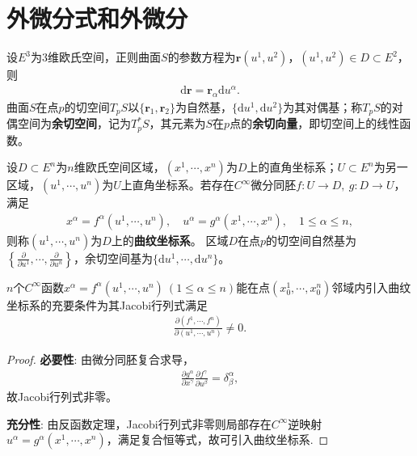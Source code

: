 \documentclass[../../main.tex]{subfiles}%
\begin{document}
\section{外微分式和外微分}

\begin{definition}
设$E^3$为3维欧氏空间，正则曲面$S$的参数方程为$\boldsymbol{r}(u^1,u^2)$，$(u^1,u^2)\in D\subset E^2$，则
\begin{align}
\mathrm{d}\boldsymbol{r}=\boldsymbol{r}_\alpha\mathrm{d}u^\alpha.
\label{eq:dr_surface}
\end{align}
曲面$S$在点$p$的切空间$T_pS$以$\{\boldsymbol{r}_1,\boldsymbol{r}_2\}$为自然基，$\{\mathrm{d}u^1,\mathrm{d}u^2\}$为其对偶基；称$T_pS$的对偶空间为\textbf{余切空间}，记为$T_p^*S$，其元素为$S$在$p$点的\textbf{余切向量}，即切空间上的线性函数。
\end{definition}

\begin{definition}
设$D\subset E^n$为$n$维欧氏空间区域，$(x^1,\cdots,x^n)$为$D$上的直角坐标系；$U\subset E^n$为另一区域，$(u^1,\cdots,u^n)$为$U$上直角坐标系。若存在$C^\infty$微分同胚$f:U\to D,\ g:D\to U$，满足
\begin{align*}
x^\alpha=f^\alpha(u^1,\cdots,u^n),\quad u^\alpha=g^\alpha(x^1,\cdots,x^n),\quad 1\leqslant\alpha\leqslant n,
\end{align*}
则称$(u^1,\cdots,u^n)$为$D$上的\textbf{曲纹坐标系}。
区域$D$在点$p$的切空间自然基为$\left\{\frac{\partial}{\partial u^1},\cdots,\frac{\partial}{\partial u^n}\right\}$，余切空间基为$\{\mathrm{d}u^1,\cdots,\mathrm{d}u^n\}$。
\end{definition}

\begin{proposition}
$n$个$C^\infty$函数$x^\alpha=f^\alpha(u^1,\cdots,u^n)\ (1\leqslant\alpha\leqslant n)$能在点$(x_0^1,\cdots,x_0^n)$邻域内引入曲纹坐标系的充要条件为其Jacobi行列式满足
\begin{align}
\frac{\partial(f^1,\cdots,f^n)}{\partial(u^1,\cdots,u^n)}\neq0.
\label{eq:jacobi_nonzero}
\end{align}
\end{proposition}
\begin{proof}

\textbf{必要性}: 由微分同胚复合求导，
\begin{align*}
\frac{\partial g^\alpha}{\partial x^\gamma}\frac{\partial f^\gamma}{\partial u^\beta}=\delta_\beta^\alpha,
\end{align*}
故Jacobi行列式非零。

\textbf{充分性}: 由反函数定理，Jacobi行列式非零则局部存在$C^\infty$逆映射$u^\alpha=g^\alpha(x^1,\cdots,x^n)$，满足复合恒等式，故可引入曲纹坐标系.

\end{proof}
\end{document}

